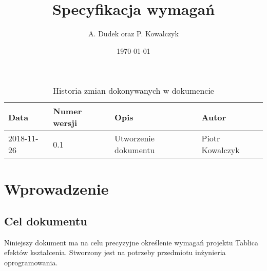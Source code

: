 \documentclass{article}
\title{Specyfikacja wymagań}
\date{\today}
\author{A. Dudek oraz P. Kowalczyk}
\begin{document}
\begin{titlepage}







\end{titlepage}

\addtocounter{page}{1}
\newpage

\begin{table}
	\begin{center}
		\caption{Historia zmian dokonywanych w dokumencie}
		\begin{tabular}{|l|l|l|l|}
			\hline
			Data & Numer wersji & Opis & Autor \\
		  \hline \hline
      2018-11-26 & 0.1 & Utworzenie dokumentu & Piotr Kowalczyk \\
      \hline
    \end{tabular}
	\end{center}
\end{table}	

\tableofcontents

\newpage


\section{Wprowadzenie}

\subsection{Cel dokumentu}
Niniejszy dokument ma na celu precyzyjne określenie wymagań projektu Tablica efektów kształcenia. Stworzony jest na potrzeby przedmiotu inżynieria oprogramowania.
\end{document}
